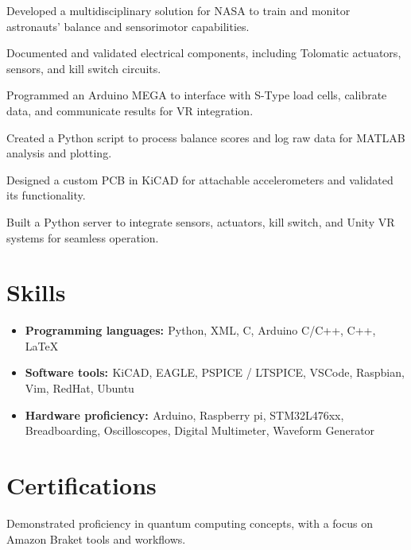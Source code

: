 \documentclass[a4paper]{comcv}
\begin{document}
\smallskip
    \begin{tightlist}
        \item Developed a multidisciplinary solution for NASA to train and monitor astronauts' balance and sensorimotor capabilities.
        \item Documented and validated electrical components, including Tolomatic actuators, sensors, and kill switch circuits.
        \item Programmed an Arduino MEGA to interface with S-Type load cells, calibrate data, and communicate results for VR integration.
        \item Created a Python script to process balance scores and log raw data for MATLAB analysis and plotting.
        \item Designed a custom PCB in KiCAD for attachable accelerometers and validated its functionality.
        \item Built a Python server to integrate sensors, actuators, kill switch, and Unity VR systems for seamless operation.

\end{tightlist}
\smallskip


\section{Skills}
\smallskip
\begin{itemize}
    \item {\bf{Programming languages: }}  {Python, XML, C, Arduino C/C++, C++, \LaTeX} 
    \item {\bf{Software tools: }} {KiCAD, EAGLE, PSPICE / LTSPICE, VSCode, Raspbian, Vim, RedHat, Ubuntu}
    \item {\bf{Hardware proficiency: }}  {Arduino, Raspberry pi, STM32L476xx, Breadboarding, Oscilloscopes, Digital Multimeter, Waveform Generator} 
\end{itemize}
\smallskip

\section{Certifications}
\smallskip

\smallskip
\begin{tightlist}
    \item Demonstrated proficiency in quantum computing concepts, with a focus on Amazon Braket tools and workflows.
\end{tightlist}
\end{document}
